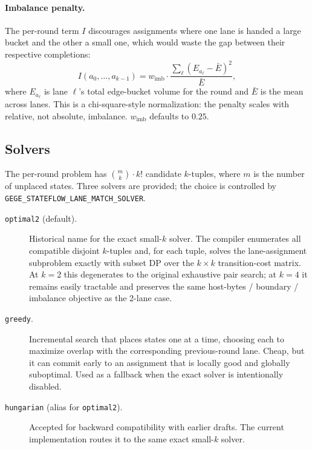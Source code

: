 \paragraph{Imbalance penalty.} The per-round term $I$ discourages
assignments where one lane is handed a large bucket and the other a
small one, which would waste the gap between their respective
completions:
\begin{equation}
I(a_0, \dots, a_{k-1}) = w_{\mathrm{imb}}
  \cdot \frac{\sum_\ell (E_{a_\ell} - \bar E)^2}{\bar E},
\label{eq:imbalance}
\end{equation}
where $E_{a_\ell}$ is lane $\ell$'s total edge-bucket volume for the
round and $\bar E$ is the mean across lanes. This is a chi-square-style
normalization: the penalty scales with relative, not absolute,
imbalance. $w_{\mathrm{imb}}$ defaults to $0.25$.

\subsection{Solvers}\label{sec:compiler:solvers}

The per-round problem has $\binom{m}{k} \cdot k!$ candidate
$k$-tuples, where $m$ is the number of unplaced states. Three solvers
are provided; the choice is controlled by
\texttt{GEGE\_STATEFLOW\_LANE\_MATCH\_SOLVER}.

\begin{description}
\item[\texttt{optimal2} (default).] Historical name for the exact
small-$k$ solver. The compiler enumerates all compatible disjoint
$k$-tuples and, for each tuple, solves the lane-assignment subproblem
exactly with subset DP over the $k \times k$ transition-cost matrix.
At $k{=}2$ this degenerates to the original exhaustive pair search;
at $k{=}4$ it remains easily tractable and preserves the same
host-bytes / boundary / imbalance objective as the 2-lane case.

\item[\texttt{greedy}.] Incremental search that places states one at a
time, choosing each to maximize overlap with the corresponding
previous-round lane. Cheap, but it can commit early to an assignment
that is locally good and globally suboptimal. Used as a fallback when
the exact solver is intentionally disabled.

\item[\texttt{hungarian} (alias for \texttt{optimal2}).] Accepted for
backward compatibility with earlier drafts. The current implementation
routes it to the same exact small-$k$ solver.
\end{description}

